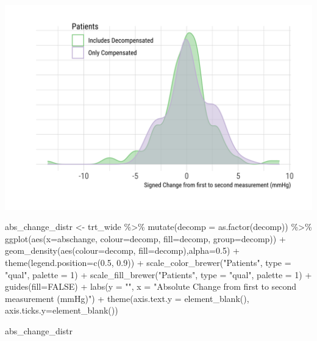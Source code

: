 \documentclass[
]{article}
\newenvironment{Shaded}{\begin{snugshade}}{\end{snugshade}}
\newcommand{\AttributeTok}[1]{\textcolor[rgb]{0.77,0.63,0.00}{#1}}
\newcommand{\ConstantTok}[1]{\textcolor[rgb]{0.00,0.00,0.00}{#1}}
\newcommand{\DecValTok}[1]{\textcolor[rgb]{0.00,0.00,0.81}{#1}}
\newcommand{\FloatTok}[1]{\textcolor[rgb]{0.00,0.00,0.81}{#1}}
\newcommand{\FunctionTok}[1]{\textcolor[rgb]{0.00,0.00,0.00}{#1}}
\newcommand{\NormalTok}[1]{#1}
\newcommand{\OtherTok}[1]{\textcolor[rgb]{0.56,0.35,0.01}{#1}}
\newcommand{\SpecialCharTok}[1]{\textcolor[rgb]{0.00,0.00,0.00}{#1}}
\newcommand{\StringTok}[1]{\textcolor[rgb]{0.31,0.60,0.02}{#1}}
\begin{document}
\includegraphics{figures/unnamed-chunk-32-1.png}

\begin{Shaded}
\begin{Highlighting}[]
\NormalTok{abs\_change\_distr }\OtherTok{\textless{}{-}}\NormalTok{ trt\_wide }\SpecialCharTok{\%\textgreater{}\%} 
  \FunctionTok{mutate}\NormalTok{(}\AttributeTok{decomp =} \FunctionTok{as.factor}\NormalTok{(decomp)) }\SpecialCharTok{\%\textgreater{}\%} 
  \FunctionTok{ggplot}\NormalTok{(}\FunctionTok{aes}\NormalTok{(}\AttributeTok{x=}\NormalTok{abschange, }\AttributeTok{colour=}\NormalTok{decomp, }\AttributeTok{fill=}\NormalTok{decomp, }\AttributeTok{group=}\NormalTok{decomp)) }\SpecialCharTok{+}
  \FunctionTok{geom\_density}\NormalTok{(}\FunctionTok{aes}\NormalTok{(}\AttributeTok{colour=}\NormalTok{decomp, }\AttributeTok{fill=}\NormalTok{decomp),}\AttributeTok{alpha=}\FloatTok{0.5}\NormalTok{) }\SpecialCharTok{+}
  \FunctionTok{theme}\NormalTok{(}\AttributeTok{legend.position=}\FunctionTok{c}\NormalTok{(}\FloatTok{0.5}\NormalTok{, }\FloatTok{0.9}\NormalTok{)) }\SpecialCharTok{+}
  \FunctionTok{scale\_color\_brewer}\NormalTok{(}\StringTok{"Patients"}\NormalTok{, }\AttributeTok{type =} \StringTok{"qual"}\NormalTok{, }\AttributeTok{palette =} \DecValTok{1}\NormalTok{) }\SpecialCharTok{+}
  \FunctionTok{scale\_fill\_brewer}\NormalTok{(}\StringTok{"Patients"}\NormalTok{, }\AttributeTok{type =} \StringTok{"qual"}\NormalTok{, }\AttributeTok{palette =} \DecValTok{1}\NormalTok{) }\SpecialCharTok{+}
  \FunctionTok{guides}\NormalTok{(}\AttributeTok{fill=}\ConstantTok{FALSE}\NormalTok{) }\SpecialCharTok{+}
  \FunctionTok{labs}\NormalTok{(}\AttributeTok{y =} \StringTok{""}\NormalTok{,}
       \AttributeTok{x =} \StringTok{"Absolute Change from first to second measurement (mmHg)"}\NormalTok{) }\SpecialCharTok{+}
  \FunctionTok{theme}\NormalTok{(}\AttributeTok{axis.text.y =} \FunctionTok{element\_blank}\NormalTok{(),}
        \AttributeTok{axis.ticks.y=}\FunctionTok{element\_blank}\NormalTok{())}

\NormalTok{abs\_change\_distr}
\end{Highlighting}
\end{Shaded}
\end{document}
